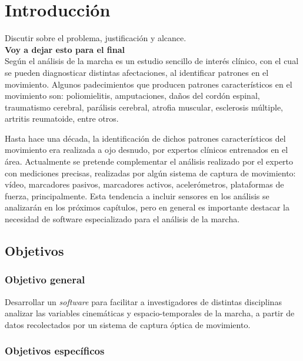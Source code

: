 \chapter{Introducción}

Discutir sobre el problema, justificación y alcance. \\
{\Large\textbf{Voy a dejar esto para el final}}\\
Según \cite{perry} el análisis de la marcha es un estudio sencillo de interés clínico, con el cual se pueden diagnosticar distintas afectaciones, al identificar patrones en el movimiento. Algunos padecimientos que producen patrones característicos en el movimiento son: poliomielitis, amputaciones, daños del cordón espinal, traumatismo cerebral, parálisis cerebral, atrofia muscular, esclerosis múltiple, artritis reumatoide, entre otros. 

Hasta hace una década, la identificación de dichos patrones característicos del movimiento era realizada a ojo desnudo, por expertos clínicos entrenados en el área. Actualmente se pretende complementar el análisis realizado por el experto con mediciones precisas, realizadas por algún sistema de captura de movimiento: vídeo, marcadores pasivos, marcadores activos, acelerómetros, plataformas de fuerza, principalmente. Esta tendencia a incluir sensores en los análisis se analizarán en los próximos capítulos, pero en general es importante destacar la necesidad de software especializado para el análisis de la marcha. 


\section{Objetivos}

\subsection{Objetivo general}

Desarrollar un \emph{software} para facilitar a investigadores de distintas disciplinas analizar las variables cinemáticas y espacio-temporales de la marcha, a partir de datos recolectados por un sistema de captura óptica de movimiento.

\subsection{Objetivos específicos}

